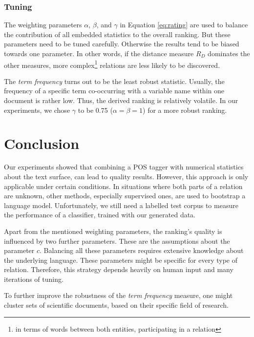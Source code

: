 \documentclass[runningheads]{llncs}
\begin{document}
\subsubsection{Tuning}
The weighting parameters $\alpha$, $\beta$, and $\gamma$ in Equation
\ref{eq:rating} are used to balance the contribution of all embedded
statistics to the overall ranking. But these parameters need to be tuned
carefully. Otherwise the results tend to be biased towards one parameter. In
other words, if the distance measure $R_{D}$ dominates the other measures,
more complex\footnote{in terms of words between both entities, participating
in a relation} relations are less likely to be discovered.

The \emph{term frequency} turns out to be the least robust statistic. Usually,
the frequency of a specific term co-occurring with a variable name within one
document is rather low. Thus, the derived ranking is relatively volatile. In
our experiments, we chose $\gamma$ to be 0.75 ($\alpha = \beta = 1$) for a
more robust ranking.

\section{Conclusion}
Our experiments showed that combining a POS tagger with numerical statistics
about the text surface, can lead to quality results. However, this approach is
only applicable under certain conditions. In situations where both parts of a
relation are unknown, other methods, especially supervised ones, are used to
bootstrap a language model. Unfortunately, we still need a labelled test
corpus to measure the performance of a classifier, trained with our generated
data.

Apart from the mentioned weighting parameters, the ranking's quality is
influenced by two further parameters. These are the assumptions about the
parameter $c$. Balancing all these parameters requires extensive knowledge
about the underlying language. These parameters might be specific for every
type of relation. Therefore, this strategy depends heavily on human input and
many iterations of tuning.

To further improve the robustness of the \emph{term frequency} measure, one
might cluster sets of scientific documents, based on their specific field of
research.





\end{document}
